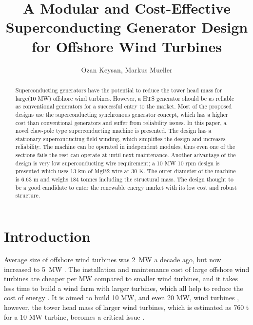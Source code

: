 \documentclass[12pt]{iopart}
\begin{document}
\title[]{A Modular and Cost-Effective Superconducting Generator Design for Offshore Wind Turbines}
\author{Ozan Keysan, Markus Mueller}

\address{Institute for Energy Systems,
University of Edinburgh, 
EH93JL, UK}

\begin{abstract}

Superconducting generators have the potential to reduce the tower head mass for large(\~ 10 MW) offshore wind turbines. However, a HTS generator should be as reliable as conventional generators for a successful entry to the market. Most of the proposed designs use the superconducting synchronous generator concept, which has a higher cost than conventional generators and suffer from reliability issues. In this paper, a novel claw-pole type superconducting machine is presented. The design has a stationary superconducting field winding, which simplifies the design and increases reliability. The machine can be operated in independent modules, thus even one of the sections fails the rest can operate at until next maintenance. Another advantage of the design is very low superconducting wire requirement; a 10 MW 10 rpm design is presented which uses 13 km of MgB2 wire at 30 K. The outer
diameter of the machine is 6.63 m and weighs 184 tonnes including the structural mass. The design thought to be a good candidate to enter the renewable energy market with its low cost and robust structure.

\end{abstract}

\maketitle

\section{Introduction}

Average size of offshore wind turbines was 2~MW a decade ago, but now increased to 5~MW \cite{bvg}. The installation and maintenance cost of large offshore wind turbines are cheaper per MW compared to smaller wind turbines, and it takes less time to build a wind farm with larger turbines, which all help to reduce the cost of energy \cite{Bang2008}. It is aimed to build 10 MW, and even 20 MW, wind turbines \cite{upwind}, however, the tower head mass of larger wind turbines, which is estimated as 760 t for a 10 MW turbine, becomes a critical issue \cite{upwind}.
\end{document}
